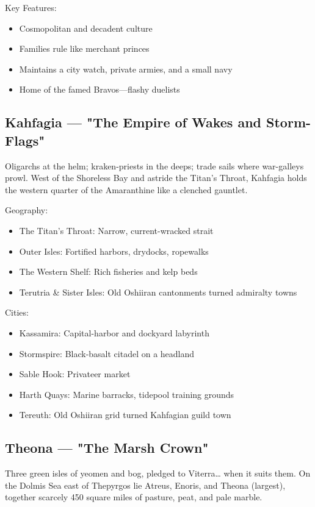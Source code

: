 Key Features:
\begin{itemize}
    \item Cosmopolitan and decadent culture
    \item Families rule like merchant princes
    \item Maintains a city watch, private armies, and a small navy
    \item Home of the famed Bravos—flashy duelists
\end{itemize}

\subsection{Kahfagia — "The Empire of Wakes and Storm-Flags"}
\label{sec:kahfagia}

Oligarchs at the helm; kraken-priests in the deeps; trade sails where war-galleys prowl. West of the Shoreless Bay and astride the Titan's Throat, Kahfagia holds the western quarter of the Amaranthine like a clenched gauntlet.

Geography:
\begin{itemize}
    \item The Titan's Throat: Narrow, current-wracked strait
    \item Outer Isles: Fortified harbors, drydocks, ropewalks
    \item The Western Shelf: Rich fisheries and kelp beds
    \item Terutria \& Sister Isles: Old Oshiiran cantonments turned admiralty towns
\end{itemize}

Cities:
\begin{itemize}
    \item Kassamira: Capital-harbor and dockyard labyrinth
    \item Stormspire: Black-basalt citadel on a headland
    \item Sable Hook: Privateer market
    \item Harth Quays: Marine barracks, tidepool training grounds
    \item Tereuth: Old Oshiiran grid turned Kahfagian guild town
\end{itemize}

\subsection{Theona — "The Marsh Crown"}
\label{sec:theona}

Three green isles of yeomen and bog, pledged to Viterra… when it suits them. On the Dolmis Sea east of Thepyrgos lie Atreus, Enoris, and Theona (largest), together scarcely 450 square miles of pasture, peat, and pale marble.

